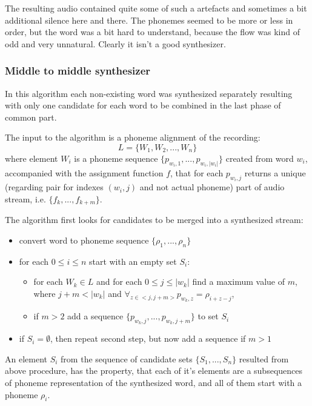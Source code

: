 \documentclass[12pt,a4paper,english]{article}
\begin{document}
The resulting audio contained quite some of such a artefacts and sometimes a bit additional silence here and there. The phonemes seemed to be more or less in order, but the word was a bit hard to understand, because the flow was kind of odd and very unnatural. Clearly it isn't a good synthesizer.

\newpage
\subsubsection{Middle to middle synthesizer}

In this algorithm each non-existing word was synthesized separately resulting with only one candidate for each word to be combined in the last phase of common part. \newline

The input to the algorithm is a phoneme alignment of the recording:
\begin{equation}
    L = \{ W_1, W_2, ..., W_n \}
\end{equation}
 where element $W_i$ is a phoneme sequence $\{p_{w_i, 1}, ..., p_{w_i, |w_i|}\}$ created from word $w_i$,
 accompanied with the assignment function $f$, that for each $p_{w_i, j}$ returns a unique (regarding pair for indexes $(w_i, j)$ and not actual phoneme) part of audio stream, i.e. $\{f_k, ..., f_{k+m}\}$. \newline

The algorithm first looks for candidates to be merged into a synthesized stream:
\begin{itemize}
    \item convert word to phoneme sequence $\{\rho_1, ..., \rho_n\}$
    \item for each $0 \leq i \leq n$ start with an empty set $S_i$:
    \begin{itemize}
        \item for each $W_k \in L$ and for each $0 \leq j \leq |w_k|$ find a maximum value of $m$, \newline
              where $j+m < |w_k|$ and $\forall_{z \in <j, j+m>} p_{w_k, z} = \rho_{i+z-j}$,
        \item if $m > 2$ add a sequence $\{p_{w_k, j}, ..., p_{w_k, j + m}\}$ to set $S_i$
    \end{itemize}
    \item if $S_i=\emptyset$, then repeat second step, but now add a sequence if $m>1$
\end{itemize}

An element $S_i$ from the sequence of candidate sets $\{S_1,...,S_n\}$ resulted from above procedure, has the property, that each of it's elements are a subsequences of phoneme representation of the synthesized word, and all of them start with a phoneme $\rho_i$. \newline
\end{document}
